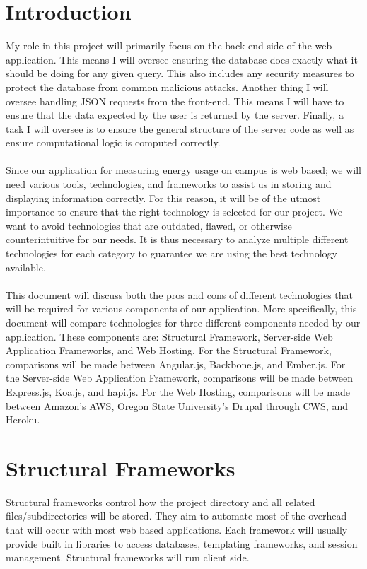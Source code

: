 \documentclass[onecolumn, draftclsnofoot,10pt, compsoc]{IEEEtran}
\begin{document}
\section{Introduction}
	My role in this project will primarily focus on the back-end side of the web application. This means I will oversee ensuring the database does exactly what it should be doing for any given query. This also includes any security measures to protect the database from common malicious attacks. Another thing I will oversee handling JSON requests from the front-end. This means I will have to ensure that the data expected by the user is returned by the server. Finally, a task I will oversee is to ensure the general structure of the server code as well as ensure computational logic is computed correctly.\\\\
	Since our application for measuring energy usage on campus is web based; we will need various tools, technologies, and frameworks to assist us in storing and displaying information correctly. For this reason, it will be of the utmost importance to ensure that the right technology is selected for our project. We want to avoid technologies that are outdated, flawed, or otherwise counterintuitive for our needs. It is thus necessary to analyze multiple different technologies for each category to guarantee we are using the best technology available.\\\\
This document will discuss both the pros and cons of different technologies that will be required for various components of our application. More specifically, this document will compare technologies for three different components needed by our application. These components are: Structural Framework, Server-side Web Application Frameworks, and Web Hosting. For the Structural Framework, comparisons will be made between Angular.js, Backbone.js, and Ember.js. For the Server-side Web Application Framework, comparisons will be made between Express.js, Koa.js, and hapi.js. For the Web Hosting, comparisons will be made between Amazon's AWS, Oregon State University's Drupal through CWS, and Heroku.



\section{Structural Frameworks}
	Structural frameworks control how the project directory and all related files/subdirectories will be stored. They aim to automate most of the overhead that will occur with most web based applications. Each framework will usually provide built in libraries to access databases, templating frameworks, and session management. Structural frameworks will run client side.
\end{document}
